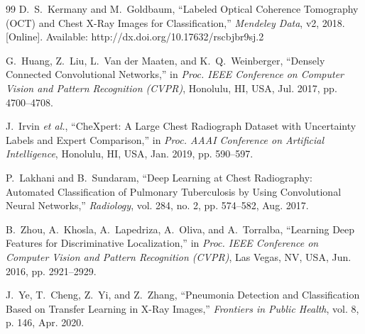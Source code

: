 \documentclass[conference]{IEEEtran}
\begin{document}
\begin{thebibliography}{99}
D.~S.~Kermany and M.~Goldbaum, ``Labeled Optical Coherence Tomography (OCT) and Chest X-Ray Images for Classification,'' \emph{Mendeley Data}, v2, 2018. [Online]. Available: http://dx.doi.org/10.17632/rscbjbr9sj.2

G.~Huang, Z.~Liu, L.~Van der Maaten, and K.~Q.~Weinberger, ``Densely Connected Convolutional Networks,'' in \emph{Proc. IEEE Conference on Computer Vision and Pattern Recognition (CVPR)}, Honolulu, HI, USA, Jul. 2017, pp. 4700–4708.

J.~Irvin \textit{et al.}, ``CheXpert: A Large Chest Radiograph Dataset with Uncertainty Labels and Expert Comparison,'' in \emph{Proc. AAAI Conference on Artificial Intelligence}, Honolulu, HI, USA, Jan. 2019, pp. 590–597.

P.~Lakhani and B.~Sundaram, ``Deep Learning at Chest Radiography: Automated Classification of Pulmonary Tuberculosis by Using Convolutional Neural Networks,'' \emph{Radiology}, vol. 284, no. 2, pp. 574–582, Aug. 2017.

B.~Zhou, A.~Khosla, A.~Lapedriza, A.~Oliva, and A.~Torralba, ``Learning Deep Features for Discriminative Localization,'' in \emph{Proc. IEEE Conference on Computer Vision and Pattern Recognition (CVPR)}, Las Vegas, NV, USA, Jun. 2016, pp. 2921–2929.

J.~Ye, T.~Cheng, Z.~Yi, and Z.~Zhang, ``Pneumonia Detection and Classification Based on Transfer Learning in X-Ray Images,'' \emph{Frontiers in Public Health}, vol. 8, p. 146, Apr. 2020.

\end{thebibliography}
\end{document}
